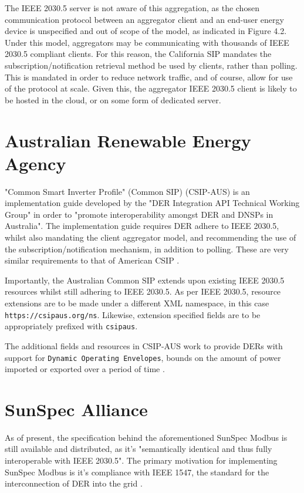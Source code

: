 The IEEE 2030.5 server is not aware of this aggregation, as the chosen communication protocol between an aggregator client and an end-user energy device is unspecified and out of scope of the model, as indicated in Figure 4.2.
Under this model, aggregators may be communicating with thousands of IEEE 2030.5 compliant clients. For this reason, the California SIP mandates the subscription/notification retrieval method be used by clients, rather than polling.
This is mandated in order to reduce network traffic, and of course, allow for use of the protocol at scale.
Given this, the aggregator IEEE 2030.5 client is likely to be hosted in the cloud, or on some form of dedicated server.


\section{Australian Renewable Energy Agency}
"Common Smart Inverter Profile" (Common SIP) (CSIP-AUS) is an implementation guide developed by the "DER Integration API Technical Working Group" in order to "promote interoperability amongst DER and DNSPs in Australia".
The implementation guide requires DER adhere to IEEE 2030.5, whilst also mandating the client aggregator model, and recommending the use of the subscription/notification mechanism, in addition to polling. These are very similar requirements to that of American CSIP \cite[]{CSIPAus}. 

Importantly, the Australian Common SIP extends upon existing IEEE 2030.5 resources whilst still adhering to IEEE 2030.5.
As per IEEE 2030.5, resource extensions are to be made under a different XML namespace, in this case \texttt{https://csipaus.org/ns}. Likewise, extension specified fields are to be appropriately prefixed with \texttt{csipaus}. 

The additional fields and resources in CSIP-AUS work to provide DERs with support for \texttt{Dynamic Operating Envelopes}, bounds on the amount of power imported or exported over a period of time \cite[]{CSIPAus}. 

\section{SunSpec Alliance}

As of present, the specification behind the aforementioned SunSpec Modbus is still available and distributed, as it's "semantically identical and thus fully interoperable with IEEE 2030.5". 
The primary motivation for implementing SunSpec Modbus is it's compliance with IEEE 1547, the standard for the interconnection of DER into the grid \cite[]{SunSpecModbus}. 

